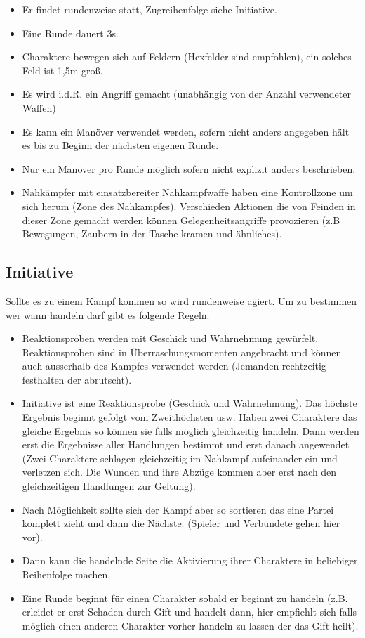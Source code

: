 \documentclass{article}
\begin{document}
\begin{itemize}
\item Er findet rundenweise statt, Zugreihenfolge siehe Initiative.
\item Eine Runde dauert 3s.
\item Charaktere bewegen sich auf Feldern (Hexfelder sind empfohlen), ein solches Feld ist 1,5m groß.
\item Es wird i.d.R. ein Angriff gemacht (unabhängig von der Anzahl verwendeter Waffen)
\item Es kann ein Manöver verwendet werden, sofern nicht anders angegeben hält es bis zu Beginn der nächsten eigenen Runde.
\item Nur ein Manöver pro Runde möglich sofern nicht explizit anders beschrieben.
\item Nahkämpfer mit einsatzbereiter Nahkampfwaffe haben eine Kontrollzone um sich herum (Zone des Nahkampfes). Verschieden Aktionen die von Feinden in dieser Zone gemacht werden können Gelegenheitsangriffe provozieren (z.B Bewegungen, Zaubern in der Tasche kramen und ähnliches).
\end{itemize}

\begin{center}
\subsection{Initiative}
\end{center}

Sollte es zu einem Kampf kommen so wird rundenweise agiert. Um zu bestimmen wer wann handeln darf gibt es folgende
Regeln:

\begin{itemize}
\item Reaktionsproben werden mit Geschick und Wahrnehmung gewürfelt. Reaktionsproben sind in Überraschungsmomenten angebracht und können auch ausserhalb des Kampfes verwendet werden (Jemanden rechtzeitig festhalten der abrutscht).
\item Initiative ist eine Reaktionsprobe (Geschick und Wahrnehmung). Das höchste Ergebnis beginnt gefolgt vom Zweithöchsten usw. Haben zwei Charaktere das gleiche Ergebnis so können sie falls möglich gleichzeitig handeln. Dann werden erst die Ergebnisse aller Handlungen bestimmt und erst danach angewendet (Zwei Charaktere schlagen gleichzeitig im Nahkampf aufeinander ein und verletzen sich. Die Wunden und ihre Abzüge kommen aber erst nach den gleichzeitigen Handlungen zur Geltung).
\item Nach Möglichkeit sollte sich der Kampf aber so sortieren das eine Partei komplett zieht und dann die Nächste. (Spieler und Verbündete gehen hier vor).
\item Dann kann die handelnde Seite die Aktivierung ihrer Charaktere in beliebiger Reihenfolge machen.
\item Eine Runde beginnt für einen Charakter sobald er beginnt zu handeln (z.B. erleidet er erst Schaden durch Gift und handelt dann, hier empfiehlt sich falls möglich einen anderen Charakter vorher handeln zu lassen der das Gift heilt).
\end{itemize}
\end{document}
